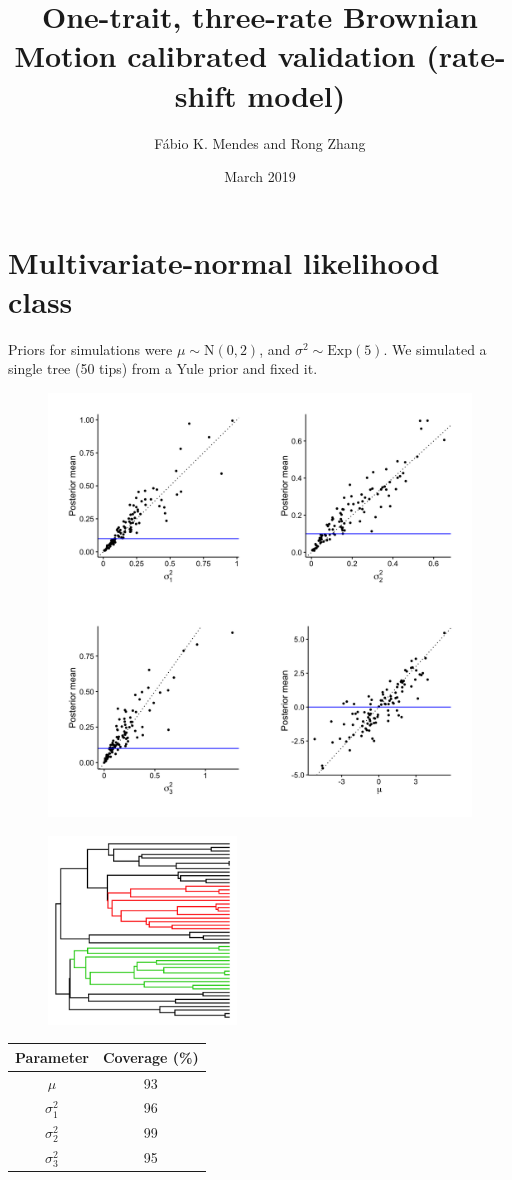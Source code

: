 \documentclass{article}
\title{One-trait, three-rate Brownian Motion calibrated validation
  (rate-shift model)}
\author{F\'{a}bio K. Mendes and Rong Zhang}
\date{March 2019}
\begin{document}
\maketitle

\newpage

\section{Multivariate-normal likelihood class}

Priors for simulations were $\mu \sim \text{N}(0, 2)$, and $\sigma^2 \sim \text{Exp}(5)$. We simulated a single tree (50 tips) from a Yule prior and fixed it.

\begin{figure}[h]
  \centering
  \includegraphics[width=12cm]{../BMMVNShiftThreeRates_ultra_graphs.png}
\end{figure}

\begin{figure}[h]
  \centering
  \includegraphics[width=5cm]{../BMMVNShiftThreeRates_ultra_tree.png}
\end{figure}

\begin{center}
\begin{tabular}{c | c}
  Parameter & Coverage (\%) \\\hline
  $\mu$ & 93\\
  $\sigma_1^2$ & 96\\
  $\sigma_2^2$ & 99\\
  $\sigma_3^2$ & 95
\end{tabular}
\end{center}
\end{document}
